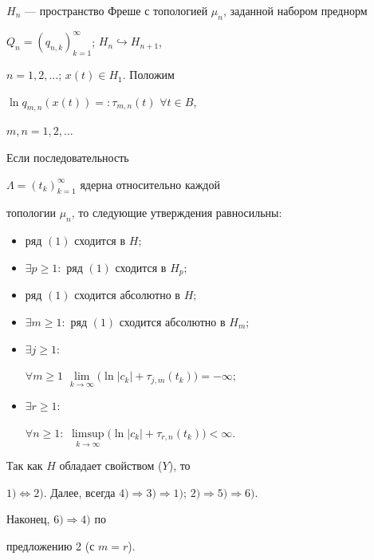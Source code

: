 $H_n$ --- пространство Фреше с топологией $\mu_n$, заданной набором преднорм


$Q_n=(q_{n,k})_{k=1}^{\infty}$; $H_n\hookrightarrow H_{n+1}$,


$n=1,2,\dotsc$; $x(t)\in H_1$. Положим 


$\ln q_{m,n}(x(t))=:\tau_{m,n}(t)$ $\forall t\in B$,


$m,n=1,2, \dotsc$





\begin{thm}


Если последовательность


$\Lambda=(t_k)_{k=1}^{\infty}$ ядерна относительно каждой


топологии $\mu_n$, то следующие утверждения равносильны\/$:$


\begin{itemize}


\item[1)] ряд $(1)$ сходится в $H;$


\item[2)] $\exists p\geqslant 1:$ ряд $(1)$ сходится в $H_p;$


\item[3)] ряд $(1)$ сходится абсолютно в $H;$


\item[4)] $\exists m\geqslant 1:$  ряд $(1)$ сходится абсолютно в $H_m;$


\item[5)] $\exists j\geqslant 1:$


$\forall m\geqslant 1$ $\lim\limits_{k\to\infty}


\big(\ln|c_k|+\tau_{j,m}(t_k)\big)=-\infty;$


\item[6)] $\exists r\geqslant 1:$


$\forall n\geqslant 1:$ $\limsup\limits_{k\to\infty}


\bigl(\ln|c_k|+\tau_{r,n}(t_k)\bigr)<\infty$.


\end{itemize}


\end{thm}





\begin{pf}


Так как $H$ обладает свойством ($Y$), то


$1)\Longleftrightarrow 2)$. Далее, всегда $4)\Longrightarrow 3)


\Longrightarrow 1)$; $2)\Longrightarrow 5) \Longrightarrow 6)$.


Наконец, $6)\Longrightarrow 4)$  по


предложению 2 (с $m=r$).


\end{pf}





